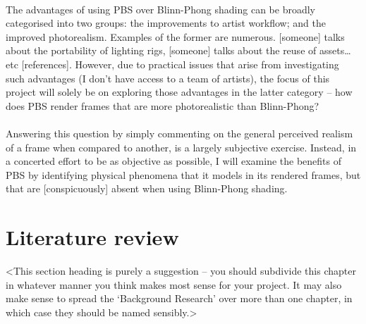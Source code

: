 \paragraph{}The advantages of using PBS over Blinn-Phong shading can be broadly categorised into two groups: the improvements to artist workflow; and the improved photorealism. Examples of the former are numerous. [someone] talks about the portability of lighting rigs, [someone] talks about the reuse of assets… etc [references]. However, due to practical issues that arise from investigating such advantages (I don’t have access to a team of artists), the focus of this project will solely be on exploring those advantages in the latter category – how does PBS render frames that are more photorealistic than Blinn-Phong?

\paragraph{}Answering this question by simply commenting on the general perceived realism of a frame when compared to another, is a largely subjective exercise. Instead, in a concerted effort to be as objective as possible, I will examine the benefits of PBS by identifying physical phenomena that it models in its rendered frames, but that are [conspicuously] absent when using Blinn-Phong shading.


\section{Literature review}
<This section heading is purely a suggestion -- you should subdivide this chapter in whatever manner you think makes most sense for your project. It may also make sense to spread the `Background Research' over more than one chapter, in which case they should be named sensibly.>

